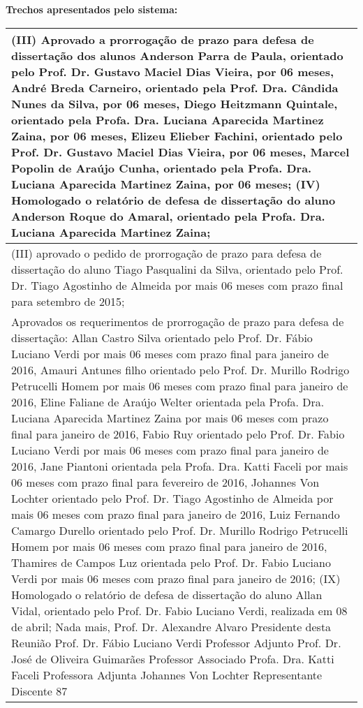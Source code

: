 \noindent
\textbf{Trechos apresentados pelo sistema:}
\begin{longtable}{|p{17.5cm}|}
\hline 
(III) Aprovado a prorrogação de prazo para defesa de dissertação dos alunos Anderson Parra de Paula, orientado pelo Prof. Dr. Gustavo Maciel Dias Vieira, por 06 meses, André Breda Carneiro, orientado pela Prof. Dra. Cândida Nunes da Silva, por 06 meses, Diego Heitzmann Quintale, orientado pela Profa. Dra. Luciana Aparecida Martinez Zaina, por 06 meses, Elizeu Elieber Fachini, orientado pelo Prof. Dr. Gustavo Maciel Dias Vieira, por 06 meses, Marcel Popolin de Araújo Cunha, orientado pela Profa. Dra. Luciana Aparecida Martinez Zaina, por 06 meses; (IV) Homologado o relatório de defesa de dissertação do aluno Anderson Roque do Amaral, orientado pela Profa. Dra. Luciana Aparecida Martinez Zaina;

 \\ \hline 
(III) aprovado o pedido de prorrogação de prazo para defesa de dissertação do aluno Tiago Pasqualini da Silva, orientado pelo Prof. Dr. Tiago Agostinho de Almeida por mais 06 meses com prazo final para setembro de 2015;

 \\ \hline 
Aprovados os requerimentos de prorrogação de prazo para defesa de dissertação: Allan Castro Silva orientado pelo Prof. Dr. Fábio Luciano Verdi por mais 06 meses com prazo final para janeiro de 2016, Amauri Antunes filho orientado pelo Prof. Dr. Murillo Rodrigo Petrucelli Homem por mais 06 meses com prazo final para janeiro de 2016, Eline Faliane de Araújo Welter orientada pela Profa. Dra. Luciana Aparecida Martinez Zaina por mais 06 meses com prazo final para janeiro de 2016, Fabio Ruy orientado pelo Prof. Dr. Fabio Luciano Verdi por mais 06 meses com prazo final para janeiro de 2016, Jane Piantoni orientada pela Profa. Dra. Katti Faceli por mais 06 meses com prazo final para fevereiro de 2016, Johannes Von Lochter orientado pelo Prof. Dr. Tiago Agostinho de Almeida por mais 06 meses com prazo final para janeiro de 2016, Luiz Fernando Camargo Durello orientado pelo Prof. Dr. Murillo Rodrigo Petrucelli Homem por mais 06 meses com prazo final para janeiro de 2016, Thamires de Campos Luz orientada pelo Prof. Dr. Fabio Luciano Verdi por mais 06 meses com prazo final para janeiro de 2016; (IX) Homologado o relatório de defesa de dissertação do aluno Allan Vidal, orientado pelo Prof. Dr. Fabio Luciano Verdi, realizada em 08 de abril; Nada mais, Prof. Dr. Alexandre Alvaro Presidente desta Reunião Prof. Dr. Fábio Luciano Verdi Professor Adjunto Prof. Dr. José de Oliveira Guimarães Professor Associado Profa. Dra. Katti Faceli Professora Adjunta Johannes Von Lochter Representante Discente 87


\end{longtable}
